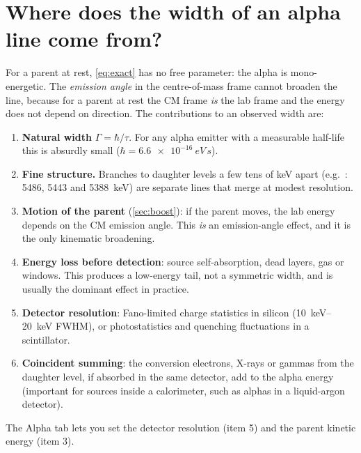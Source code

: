 \section{Where does the width of an alpha line come from?}
For a parent at rest, \cref{eq:exact} has no free parameter: the alpha is mono-energetic. The \emph{emission angle} in the centre-of-mass frame cannot broaden the line, because for a parent at rest the CM frame \emph{is} the lab frame and the energy does not depend on direction. The contributions to an observed width are:
\begin{enumerate}
\item \textbf{Natural width} $\Gamma = \hbar/\tau$. For any alpha emitter with a measurable half-life this is absurdly small ($\hbar = \SI{6.6e-16}{eV\,s}$).
\item \textbf{Fine structure.} Branches to daughter levels a few tens of keV apart (e.g.\ : 5486, 5443 and \SI{5388}{keV}) are separate lines that merge at modest resolution.
\item \textbf{Motion of the parent} (\cref{sec:boost}): if the parent moves, the lab energy depends on the CM emission angle. This \emph{is} an emission-angle effect, and it is the only kinematic broadening.
\item \textbf{Energy loss before detection}: source self-absorption, dead layers, gas or windows. This produces a low-energy tail, not a symmetric width, and is usually the dominant effect in practice.
\item \textbf{Detector resolution}: Fano-limited charge statistics in silicon (\SIrange{10}{20}{keV} FWHM), or photostatistics and quenching fluctuations in a scintillator.
\item \textbf{Coincident summing}: the conversion electrons, X-rays or gammas from the daughter level, if absorbed in the same detector, add to the alpha energy (important for sources inside a calorimeter, such as alphas in a liquid-argon detector).
\end{enumerate}
The Alpha tab lets you set the detector resolution (item 5) and the parent kinetic energy (item 3).

